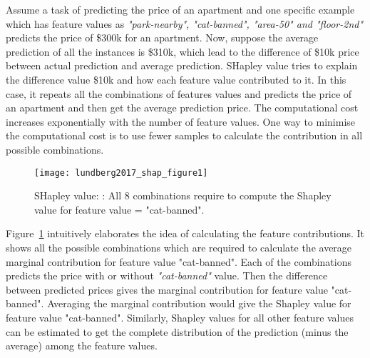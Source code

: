 \documentclass[english]{tktltiki2}
\theoremstyle{definition}
\theoremstyle{remark}
\begin{document}
Assume a task of predicting the price of an apartment and one specific example which has feature values as \textit{"park-nearby", "cat-banned", "area-50" and "floor-2nd"} predicts the price of \$300k for an apartment. Now, suppose the average prediction of all the instances is \$310k, which lead to the difference of \$10k price between actual prediction and average prediction. SHapley value tries to explain the difference value \$10k  and how each feature value contributed to it. In this case, it repeats all the combinations of features values and predicts the price of an apartment and then get the average prediction price. The computational cost increases exponentially with the number of feature values. One way to minimise the computational cost is to use fewer samples to calculate the contribution in all possible combinations.


\begin{figure}[H]
	\centering
	\vspace*{-2mm}
	\texttt{[image: lundberg2017\_shap\_figure1]}
	\vspace*{-10mm}
	\caption{SHapley value: \citep{molnarinterpretable}: All 8 combinations require to compute the Shapley value for feature value = "cat-banned".}
	\label{fig:lundberg2017_shap_figure1}
\end{figure}

Figure~\ref{fig:lundberg2017_shap_figure1} intuitively elaborates the idea of calculating the feature contributions. It shows all the possible combinations which are required to calculate the average marginal contribution for feature value "cat-banned". Each of the combinations predicts the price with or without \textit{"cat-banned"} value. Then the difference between predicted prices gives the marginal contribution for feature value "cat-banned".  Averaging the marginal contribution would give the Shapley value for feature value "cat-banned".  Similarly, Shapley values for all other feature values can be estimated to get the complete distribution of the prediction (minus the average) among the feature values.
\end{document}
